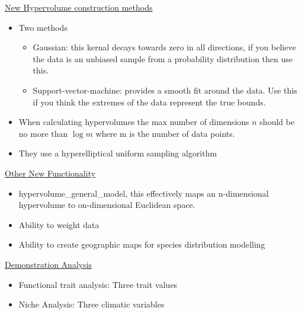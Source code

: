 \underline{New Hypervolume construction methods}
\begin{itemize}
	\item Two methods  
	\begin{itemize}
		\item Gaussian: this kernal decays towards zero in all directions, if you believe the data is an unbiased sample from a probability distribution then use this.
		\item Support-vector-machine: provides a smooth fit around the data. Use this if you think the extremes of the data represent the true bounds.
	\end{itemize}
	\item When calculating hypervolumes the max number of dimensions $n$ should be no more than $\log{m}$ where m is the number of data points.
	\item They use a hyperelliptical uniform sampling algorithm 
\end{itemize}

\underline{Other New Functionality}
\begin{itemize}
	\item hypervolume\_general\_model, this effectively maps an n-dimensional hypervolume to on-dimensional Euclidean space.
	\item Ability to weight data
	\item Ability to create geographic maps for species distribution modelling
\end{itemize}

\underline{Demonstration Analysis}
\begin{itemize}
	\item Functional trait analysis: Three trait values
	\item Niche Analysis: Three climatic variables
\end{itemize}